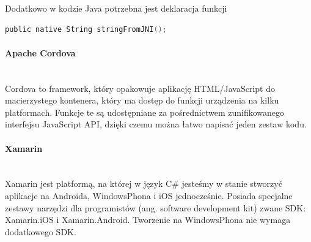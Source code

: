 Dodatkowo w kodzie Java potrzebna jest deklaracja funkcji
\begin{lstlisting}[language=C]
public native String stringFromJNI();
\end{lstlisting}
\paragraph{Apache Cordova}\mbox{}\\
Cordova to framework, który opakowuje aplikację HTML/JavaScript do macierzystego kontenera, który ma dostęp do funkcji urządzenia na kilku platformach. Funkcje te są udostępniane za pośrednictwem zunifikowanego interfejsu JavaScript API, dzięki czemu można łatwo napisać jeden zestaw kodu.
\paragraph{Xamarin}\mbox{}\\
Xamarin jest platformą, na której w język C\# jesteśmy w stanie stworzyć aplikacje na Androida, WindowsPhona i iOS jednocześnie. Posiada specjalne zestawy narzędzi dla programistów (ang. software development kit) zwane SDK: Xamarin.iOS i Xamarin.Android. Tworzenie na WindowsPhona nie wymaga dodatkowego SDK.
